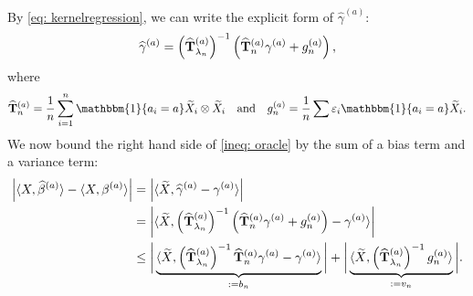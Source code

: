 \documentclass[mnsc]{informs3aa} %
\newcommand{\abs}[1]{\left|#1\right|}
\renewcommand{\hat}{\widehat}
\renewcommand{\tilde}{\widetilde}
\renewcommand{\hat}{\widehat}
\renewcommand{\tilde}{\widetilde}
\newcommand{\indi}{\mathbbm{1}}
\renewcommand{\hat}{\widehat}
\renewcommand{\tilde}{\widetilde}
\begin{document}
By \eqref{eq: kernelregression}, we can write the explicit form of $\hat\gamma^{(a)}:$
\begin{equation}\label{eq: expression_of_hatbetaa}
	\hat\gamma^{(a)}=\left(\hatTlamba\right)^{-1}\left(\hatT \gamma^{(a)}+g_n^{(a)}\right),
\end{equation}
where 
\[\hatT = \frac{1}{n}\sum_{i=1}^n \indi\{a_i=a\}\tilde X_i\otimes \tilde X_i\quad\text{and}\quad g_n^{(a)}=\frac{1}{n}\sum\varepsilon_i \indi\{a_i=a\}\tilde X_i.\]
We now bound the right hand side of \eqref{ineq: oracle} by the sum of a bias term and a variance term:
\begin{align}
	\abs{\langle X,\hat\beta^{(a)}\rangle-\langle X,\beta^{(a)}\rangle} &=\abs{\langle \tilde X,\hat\gamma^{(a)}-\gamma^{(a)}\rangle}\nonumber \\
	&=\abs{\langle \tilde X,\left(\hatTlamba\right)^{-1}\left(\hatT \gamma^{(a)}+g_n^{(a)}\right)-\gamma^{(a)}\rangle}\nonumber\\
	&\leq \bigg|\underbrace{\langle \tilde X,\left(\hatTlamba\right)^{-1}\hatT \gamma^{(a)}-\gamma^{(a)}\rangle}_{:=b_n}\bigg|+\bigg|\underbrace{\langle \tilde X,\left(\hatTlamba\right)^{-1}g_n^{(a)}\rangle}_{:=v_n}\bigg|.\label{eq: bias_and_var}
\end{align}
\end{document}
